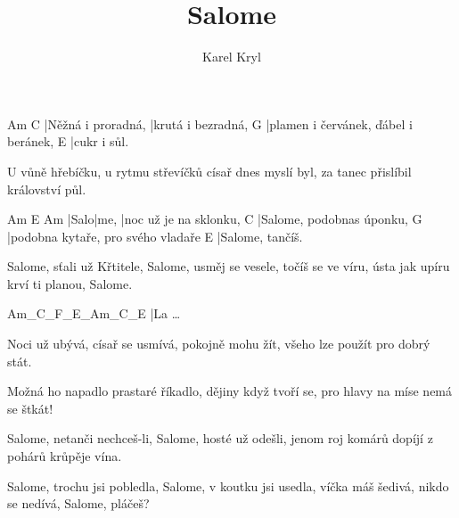 \documentclass{song}
\title{Salome}
\author{Karel Kryl}
\begin{document}
\strophe
Am                 C
|Něžná i proradná, |krutá i bezradná,
G
|plamen i červánek, ďábel i beránek,
E
|cukr i sůl.
\endstrophe

\strophe*
U vůně hřebíčku, u rytmu střevíčků
císař dnes myslí byl, za tanec přislíbil
království půl.
\endstrophe

\strophe
Am   E    Am
|Salo|me, |noc už je na sklonku,
C
|Salome, podobnas úponku,
G
|podobna kytaře, pro svého vladaře
E
|Salome, tančíš.
\endstrophe

\strophe*
Salome, sťali už Křtitele,
Salome, usměj se vesele,
točíš se ve víru, ústa jak upíru
krví ti planou, Salome.
\endstrophe

\strophe
Am_C_F_E_Am_C_E
|La \ldots
\endstrophe

\strophe*
Noci už ubývá, císař se usmívá,
pokojně mohu žít, všeho lze použít
pro dobrý stát.
\endstrophe

\strophe*
Možná ho napadlo prastaré říkadlo,
dějiny když tvoří se, pro hlavy na míse
nemá se štkát!
\endstrophe

\strophe*
Salome, netanči nechceš-li,
Salome, hosté už odešli,
jenom roj komárů dopíjí z pohárů
krůpěje vína.
\endstrophe

\strophe*
Salome, trochu jsi pobledla,
Salome, v koutku jsi usedla,
víčka máš šedivá, nikdo se nedívá,
Salome, pláčeš?
\endstrophe
\end{document}
